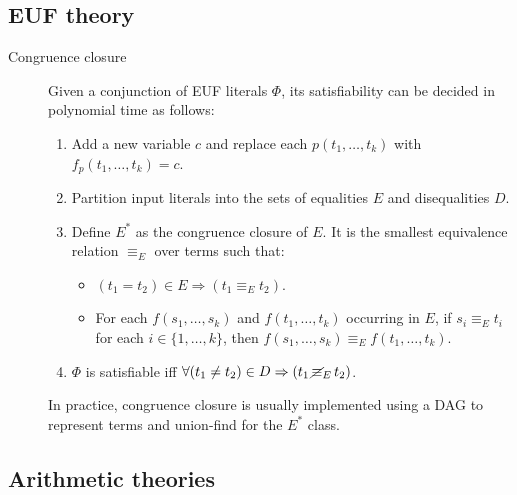 \subsection{EUF theory}

\begin{description}
    \item[Congruence closure] 
        Given a conjunction of EUF literals $\Phi$,
        its satisfiability can be decided in polynomial time as follows:
        \begin{enumerate}
            \item Add a new variable $c$ and replace each $p(t_1, \dots, t_k)$
                with $f_p(t_1, \dots, t_k) = c$.
            \item Partition input literals into the sets of equalities $E$ and disequalities $D$.
            \item Define $E^*$ as the congruence closure of $E$. 
                It is the smallest equivalence relation $\equiv_E$ over terms such that:
                \begin{itemize}
                    \item $(t_1 = t_2) \in E \Rightarrow (t_1 \equiv_E t_2)$.
                    \item For each $f(s_1, \dots, s_k)$ and $f(t_1, \dots, t_k)$ occurring in $E$,
                        if $s_i \equiv_E t_i$ for each $i \in \{ 1, \dots, k \}$, then $f(s_1, \dots, s_k) \equiv_E f(t_1, \dots, t_k)$.
                \end{itemize}
            \item $\Phi$ is satisfiable iff $\forall (t_1 \neq t_2) \in D \Rightarrow (t_1 \,\cancel{\equiv}_E\, t_2)$.
        \end{enumerate}

        \begin{remark}
            In practice, congruence closure is usually implemented using a DAG to represent terms and union-find for the $E^*$ class.
        \end{remark}
\end{description}


\subsection{Arithmetic theories}

